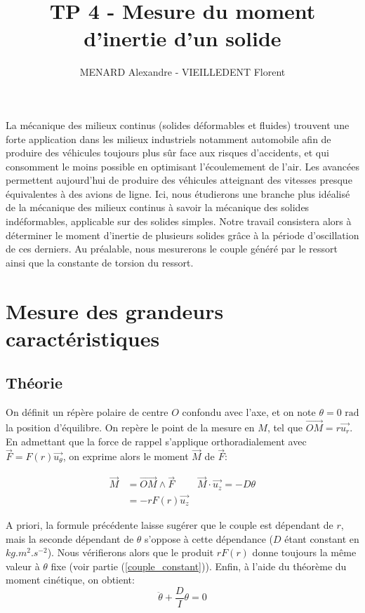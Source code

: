 \documentclass[12pt]{article}
\title{\vspace{-2cm}\textbf{TP 4 - Mesure du moment d'inertie d'un solide}}
\author{\vspace{-0.5cm}MENARD Alexandre - VIEILLEDENT Florent}
\date{\vspace{-0.7cm}}
\newcommand{\ut}{\vec{u_\theta}}
\newcommand{\ur}{\vec{u_r}}
\newcommand{\uz}{\vec{u_z}}
\begin{document}
\maketitle

La mécanique des milieux continus (solides déformables et fluides) trouvent une forte application dans les milieux industriels notamment automobile afin de produire
des véhicules toujours plus sûr face aux risques d'accidents, et qui consomment le moins possible en optimisant l'écoulemement de l'air. Les avancées permettent aujourd'hui
de produire des véhicules atteignant des vitesses presque équivalentes à des avions de ligne. Ici, nous étudierons une branche plus idéalisé de la mécanique des milieux continus à savoir la mécanique des solides
indéformables, applicable sur des solides simples. Notre travail consistera alors à déterminer le moment d'inertie de plusieurs solides grâce à la période d'oscillation de ces derniers. Au préalable,
nous mesurerons le couple généré par le ressort ainsi que la constante de torsion du ressort.

\section{Mesure des grandeurs caractéristiques}
\subsection{Théorie}
On définit un répère polaire de centre $O$ confondu avec l'axe, et on note $\theta=0 \text{ rad}$ la position d'équilibre. On repère le point
de la mesure en $M$, tel que $\vec{OM} = r\ur$. En admettant que la force de rappel
s'applique orthoradialement avec $\vec{F} = F(r) \ut$, on exprime alors le moment $\vec{M}$ de $\vec{F}$:

\begin{align}
    \vec{M} & = \vec{OM} \wedge \vec{F} & \vec{M} \cdot \uz = -D\theta \\
            & = -rF(r) \uz \nonumber
    \label{eqn:moment_ressort}
\end{align}

A priori, la formule précédente laisse sugérer que le couple est dépendant de $r$, mais la seconde dépendant de $\theta$
s'oppose à cette dépendance ($D$ étant constant en $kg.m^2.s^{-2}$). Nous vérifierons alors que le produit $rF(r)$ donne toujours la même valeur à $\theta$ fixe (voir partie (\ref{couple_constant})).
Enfin, à l'aide du théorème du moment cinétique, on obtient:
\begin{equation}
    \label{eqn:equa_diff}
    \ddot \theta + \frac{D}{I}\theta = 0
\end{equation}
\end{document}
